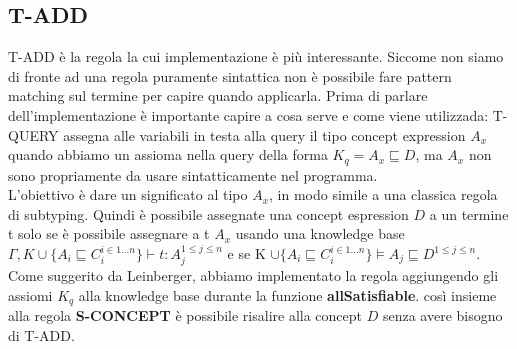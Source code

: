             \subsection{T-ADD}
            T-ADD è la regola la cui implementazione è più interessante. Siccome non siamo di fronte ad una regola puramente sintattica
            non è possibile fare pattern matching sul termine per capire quando applicarla.
            Prima di parlare dell'implementazione è importante capire a cosa serve e come viene utilizzada: T-QUERY assegna alle variabili in testa alla query
            il tipo concept expression $A_x$ quando abbiamo un assioma nella query della forma $K_q = A_x \sqsubseteq D$, ma $A_x$ non sono propriamente da usare sintatticamente nel programma. 
            \\L'obiettivo è dare un significato al tipo $A_x$, in modo simile a una classica regola di subtyping. Quindi è possibile assegnate una concept espression $D$
            a un termine t solo se è possibile assegnare a t $A_x$ usando una knowledge base $\Gamma,K \cup \{A_i \sqsubseteq C_i^{i \in 1...n}\} \vdash t : A_j^{1 \leq j \leq n}$
            e se K $\cup \{A_i \sqsubseteq C_i^{i \in 1...n}\} \vDash A_j \sqsubseteq D^{1 \leq j \leq n}$.
            \\Come suggerito da Leinberger, abbiamo implementato la regola aggiungendo gli assiomi $K_q$ alla knowledge base durante la funzione \textbf{allSatisfiable}.
            così insieme alla regola \textbf{S-CONCEPT} è possibile risalire alla concept $D$ senza avere bisogno di T-ADD.
